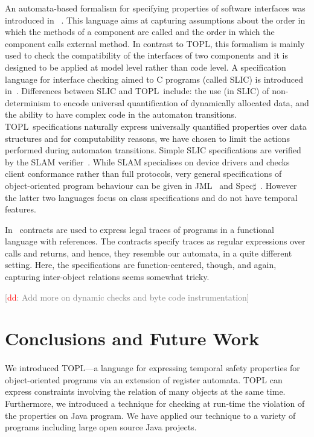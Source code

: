 \documentclass{sigplanconf}[10pt] %
\newcommand{\TPL}{TOPL}
\newcommand{\noterg}[2]{\textcolor{gray}{[\textcolor{red}{#1}: #2]}}
\newcommand{\dd}[1]{\noterg{dd}{#1}}
\newcommand{\dinocomment}[1]{\dd{#1}}
\begin{document}
An automata-based formalism for specifying properties of software interfaces was introduced in~\cite{dblp:conf/sigsoft/AlfaroH01} . 
This language aims at capturing assumptions about the order in which the methods of a component are called and the order in which the component calls external method.
In contrast to \TPL, this formalism is mainly used to check the compatibility of the interfaces of two components and it is designed to be applied at  model level rather than code level. A specification language for interface checking aimed to C programs (called SLIC) is introduced in~\cite{ball2002}.  
Differences between SLIC and \TPL \ include: the use (in SLIC) of
non-determinism to encode universal quantification of dynamically allocated data, and the  ability to have complex code in the automaton transitions. 
\TPL \ specifications naturally express universally quantified
properties over data structures and for computability reasons,  we
have chosen to limit the  actions performed during automaton transitions. 
Simple SLIC specifications are verified by  the SLAM verifier~\cite{dblp:conf/cav/ballr01}.
While SLAM specialises on device drivers and checks client conformance rather than full protocols, 
very general specifications of object-oriented program behaviour can be given in JML~\cite{jml} and Spec$\sharp$~\cite{DBLP:journals/jot/BarnettDFLS04}. However the latter two languages focus on class specifications and do not have temporal features.

In~\cite{disney2011} contracts are used to express legal traces of
programs in a functional language with references. The contracts
specify traces as regular expressions over calls and returns, and hence,
they resemble our automata, in a quite different
setting. Here, the specifications are function-centered, though, and
again, capturing inter-object relations seems somewhat tricky.

\dinocomment{Add more on dynamic checks and byte code instrumentation}

\section{Conclusions and Future Work}\label{sec:conclusions} %

\paragraph{}
We introduced TOPL---a language for expressing temporal safety properties for object-oriented programs
via an extension of register automata.
TOPL can express constraints involving the relation of many objects at the same time. 
Furthermore, we introduced a technique for checking at run-time the violation of the properties
on Java program. We have applied our technique to a variety of programs including large open source Java projects.
%
\end{document}
